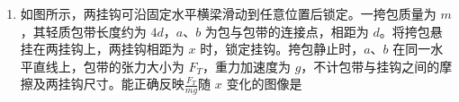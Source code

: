 \documentclass[\gkver]{gaokaozhenti}
\begin{document}
\begin{enumerate}
{故 A 错误；

$ T=\frac{1}{f}=0.5 \Us $

B．已知 $ t = 0.125 \Us $，即 $ \frac{T}{4} $，由于此时（$ t = 0 $）时 $ P $ 在波峰，则 $ t = 0.125 \Us $ 时，$ P $ 位于平衡位置，故 B 错误；

C．根据几何关系可知 $ Q $ 距离波源 $ S $ 有 $ 5 \Um $，则该波传播到 $ P $、$ Q $ 的时间差为 $ \frac{5-2}{v}=\frac{3}{4} \Us=0.75 \Us $

故 C 正确；

D．$ P $、$ Q $ 所在的波面相距 $ 3 \Um $，为 $ \frac{3}{2}\lambda $，则 $ t = 1.25 \Us $ 以后，$ P $、$ Q $ 的位移始终相反，故 D 错误。

故选 C。
}
\item
如图所示，两挂钩可沿固定水平横梁滑动到任意位置后锁定。一挎包质量为 $ m $，其轻质包带长度约为 $ 4 d $，$ a $、$ b $ 为包与包带的连接点，相距为 $ d $。将挎包悬挂在两挂钩上，两挂钩相距为 $ x $ 时，锁定挂钩。挎包静止时，$ a $、$ b $ 在同一水平直线上，包带的张力大小为 $ F_{T} $，重力加速度为 $ g $，不计包带与挂钩之间的摩擦及两挂钩尺寸。能正确反映$ \frac{{{F_{T}}}}{{mg}} $随 $ x $ 变化的图像是 

\onepicture[w=9.23cm]{}
\fourchoices[answer=D, ispicture=true, hA=2.74cm, hB=2.74cm, hC=2.74cm, hD=2.74cm]
{}
{}
{}
{}




\end{enumerate}
\end{document}
